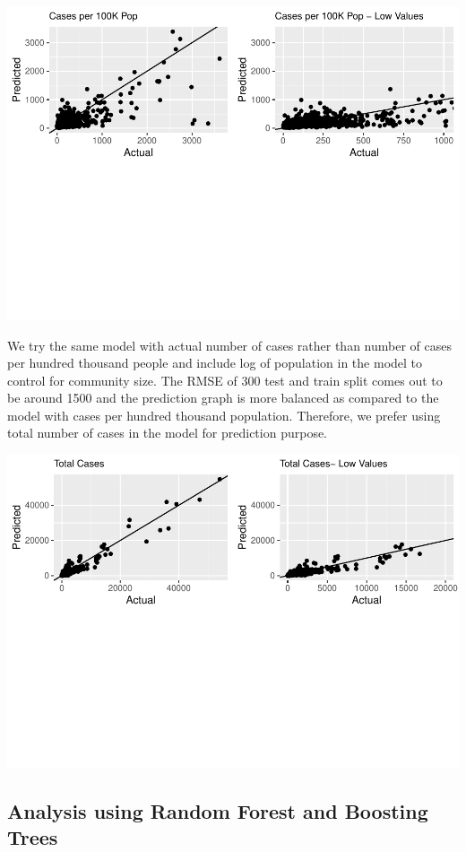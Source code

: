 \documentclass[
]{article}
\begin{document}
\includegraphics{covid_tree_analysis_files/figure-latex/unnamed-chunk-9-1.pdf}

We try the same model with actual number of cases rather than number of
cases per hundred thousand people and include log of population in the
model to control for community size. The RMSE of 300 test and train
split comes out to be around 1500 and the prediction graph is more
balanced as compared to the model with cases per hundred thousand
population. Therefore, we prefer using total number of cases in the
model for prediction purpose.

\includegraphics{covid_tree_analysis_files/figure-latex/unnamed-chunk-11-1.pdf}

\hypertarget{analysis-using-random-forest-and-boosting-trees}{%
\subsection{Analysis using Random Forest and Boosting
Trees}\label{analysis-using-random-forest-and-boosting-trees}}
\end{document}

